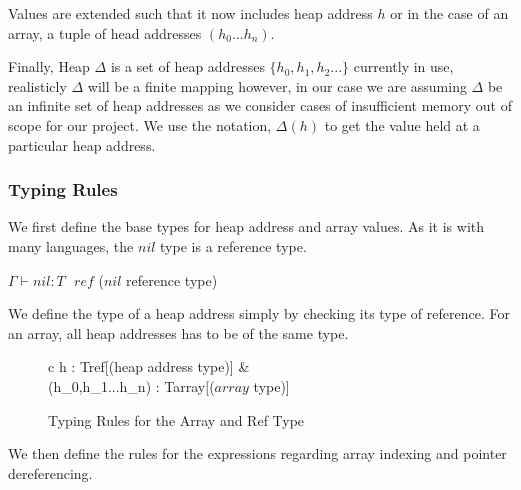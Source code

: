 \documentclass[a4paper,12pt]{report}
\begin{document}
\par
Values are extended such that it now includes heap address $h$ or in the case of 
an array, a tuple of head addresses $(h_0...h_n)$. 

\par
Finally, Heap $\Delta$ is a set of heap addresses $\{h_0, h_1, h_2...\}$ currently in use, 
realisticly $\Delta$ will be a finite mapping however, in our case we are assuming 
$\Delta$ be an infinite set of heap addresses as we consider cases of 
insufficient memory out of scope for our project. We use the notation, $\Delta(h)$ 
to get the value held at a particular heap address. 

\subsubsection{Typing Rules}

We first define the base types for heap address and array values. As it is with 
many languages, the $nil$ type is a reference type.
\begin{center}
   $\Gamma \vdash nil : T\text{ }ref$ ($nil$ reference type)
\end{center}

\par
We define the type of a heap address simply by checking its type of reference. 
For an array, all heap addresses has to be of the same type. 

\begin{figure}[H]
  \begin{center}
    \begin{tabular} {c}
        {\Gamma \vdash h : T\text{ }ref}[(heap address type)]
      & \\
        {\Gamma \vdash (h_0,h_1...h_n) : T\text{ }array}[($array$ type)] 
    \end{tabular}
  \end{center}
  \caption{Typing Rules for the Array and Ref Type}
\end{figure}

\par
We then define the rules for the expressions regarding array indexing and 
pointer dereferencing. 
\end{document}
